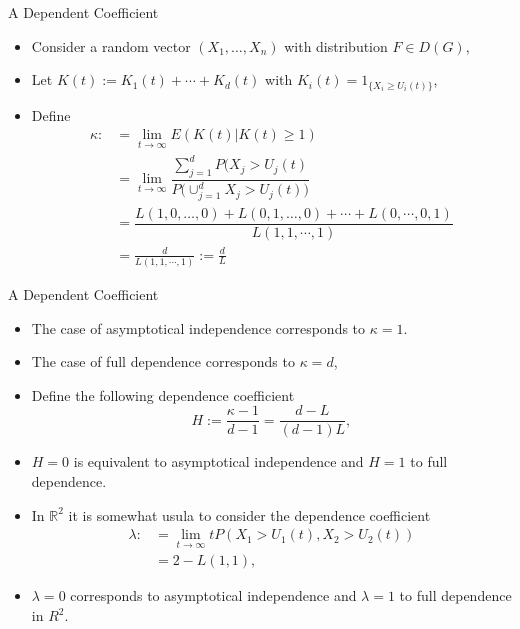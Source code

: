 \documentclass[11pt]{beamer}
\begin{document}
\begin{frame}{A Dependent Coefficient}
\begin{itemize}
\item Consider a random vector $(X_1,\dots,X_n)$ with distribution $F \in D(G)$,
\item Let $K(t):=K_1(t)+\cdots+K_d(t)$ with $K_i(t)=1_{\{ X_i\ge U_i(t)\}}$,
\item Define
\begin{displaymath}
\begin{split}
\kappa :&=\lim_{t\to \infty} E(K(t)|K(t)\ge 1)\\
            &=\lim_{t\to \infty} \dfrac{\sum_{j=1}^d P(X_j>U_j(t)}{P\big(\cup_{j=1}^d X_j>U_j(t)\big )}\\
             &=\dfrac{L(1,0,\dots,0)+L(0,1,\dots,0)+\cdots+L(0,\cdots,0,1)}{L(1,1,\cdots,1)}\\
             &=\frac{d}{L(1,1,\cdots,1)} :=\frac{d}{L}
\end{split}
\end{displaymath}
\end{itemize}
\end{frame}
\begin{frame}{A Dependent Coefficient}
\begin{itemize}
\item The case of asymptotical independence corresponds to $\kappa=1$.
\item The case of full dependence corresponds to $\kappa=d$,
\item Define the following dependence coefficient
\begin{displaymath}
H:=\frac{\kappa-1}{d-1}=\frac{d-L}{(d-1)L},
\end{displaymath}
\item $H=0$ is equivalent to asymptotical independence and $H=1$ to full dependence.
\item In $\mathbb{R}^2$ it is somewhat usula to consider the dependence coefficient 
\begin{displaymath}
\begin{split}
\lambda :&=\lim_{t\to \infty} tP(X_1>U_1(t), X_2>U_2(t))\\
&=2-L(1,1),
\end{split}
\end{displaymath}
\item $\lambda=0$ corresponds to asymptotical independence and $\lambda=1$ to full dependence in $R^2$. 
\end{itemize}
\end{frame}
\end{document}
